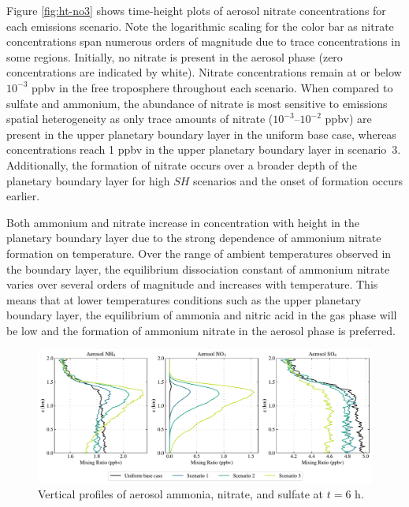 Figure \ref{fig:ht-no3} shows time-height plots of aerosol nitrate concentrations for each emissions scenario. Note the logarithmic scaling for the color bar as nitrate concentrations span numerous orders of magnitude due to trace concentrations in some regions. Initially, no nitrate is present in the aerosol phase (zero concentrations are indicated by white). Nitrate concentrations remain at or below $10^{-3}$ ppbv in the free troposphere throughout each scenario. When compared to sulfate and ammonium, the abundance of nitrate is most sensitive to emissions spatial heterogeneity as only trace amounts of nitrate ($10^{-3}$--$10^{-2}$ ppbv) are present in the upper planetary boundary layer in the uniform base case, whereas concentrations reach 1 ppbv in the upper planetary boundary layer in scenario~3. Additionally, the formation of nitrate occurs over a broader depth of the planetary boundary layer for high $SH$ scenarios and the onset of formation occurs earlier.

Both ammonium and nitrate increase in concentration with height in the planetary boundary layer due to the strong dependence of ammonium nitrate formation on temperature. Over the range of ambient temperatures observed in the boundary layer, the equilibrium dissociation constant of ammonium nitrate varies over several orders of magnitude and increases with temperature. This means that at lower temperatures conditions such as the upper planetary boundary layer, the equilibrium of ammonia and nitric acid in the gas phase will be low and the formation of ammonium nitrate in the aerosol phase is preferred. 


\begin{figure}[!t]
  \centering
    \includegraphics[width=\textwidth]{figures/chapter5/aerosol-SNA-vertical-profiles-time36.pdf}
    \caption{Vertical profiles of aerosol ammonia, nitrate, and sulfate at $t=6$ h.}
    \label{fig:sna-vertical-profile}
\end{figure}

